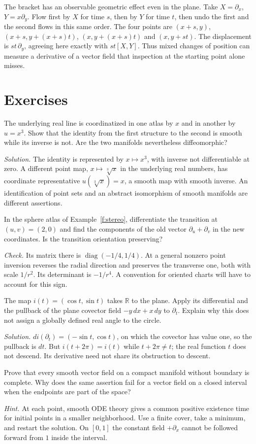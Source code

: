 The bracket has an observable geometric effect even in the plane. Take $X=\partial_x$, $Y=x\partial_y$. Flow first by $X$ for time $s$, then by $Y$ for time $t$, then undo the first and the second flows in this same order. The four points are $(x+s,y)$, $(x+s,y+(x+s)t)$, $(x,y+(x+s)t)$ and $(x,y+st)$. The displacement is $st\,\partial_y$, agreeing here exactly with $st[X,Y]$. Thus mixed changes of position can measure a derivative of a vector field that inspection at the starting point alone misses.

\Needspace{.58\textheight}
\section*{Exercises}
\begin{exercise}The underlying real line is coordinatized in one atlas by $x$ and in another by $u=x^3$. Show that the identity from the first structure to the second is smooth while its inverse is not. Are the two manifolds nevertheless diffeomorphic?\end{exercise}
\noindent\emph{Solution.} The identity is represented by $x\mapsto x^3$, with inverse not differentiable at zero. A different point map, $x\mapsto\sqrt[3]{x}$ in the underlying real numbers, has coordinate representative $u(\sqrt[3]{x})=x$, a smooth map with smooth inverse. An identification of point sets and an abstract isomorphism of smooth manifolds are different assertions.
\begin{exercise}In the sphere atlas of Example~\ref{f:stereo}, differentiate the transition at $(u,v)=(2,0)$ and find the components of the old vector $\partial_u+\partial_v$ in the new coordinates. Is the transition orientation preserving?\end{exercise}
\noindent\emph{Check.} Its matrix there is $\operatorname{diag}(-1/4,1/4)$. At a general nonzero point inversion reverses the radial direction and preserves the transverse one, both with scale $1/r^2$. Its determinant is $-1/r^4$. A convention for oriented charts will have to account for this sign.
\begin{exercise}The map $i(t)=(\cos t,\sin t)$ takes $\mathbb R$ to the plane. Apply its differential and the pullback of the plane covector field $-y\,dx+x\,dy$ to $\partial_t$. Explain why this does not assign a globally defined real angle to the circle.\end{exercise}
\noindent\emph{Solution.} $di(\partial_t)=(-\sin t,\cos t)$, on which the covector has value one, so the pullback is $dt$. But $i(t+2\pi)=i(t)$ while $t+2\pi\ne t$; the real function $t$ does not descend. Its derivative need not share its obstruction to descent.
\begin{exercise}Prove that every smooth vector field on a compact manifold without boundary is complete. Why does the same assertion fail for a vector field on a closed interval when the endpoints are part of the space?\end{exercise}
\noindent\emph{Hint.} At each point, smooth ODE theory gives a common positive existence time for initial points in a smaller neighborhood. Use a finite cover, take a minimum, and restart the solution. On $[0,1]$ the constant field $+\partial_x$ cannot be followed forward from $1$ inside the interval.
